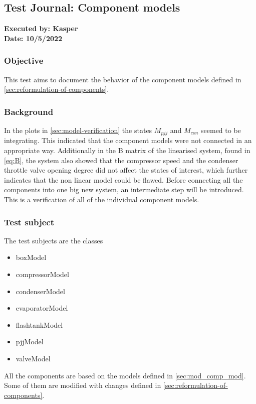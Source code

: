 \subsection{Test Journal: Component models} \label{app:tj_0}

\textbf{Executed by: Kasper} \\
\textbf{Date: 10/5/2022}

\subsubsection*{Objective}
This test aims to document the behavior of the component models defined in \cref{sec:reformulation-of-components}.

\subsubsection*{Background}
In the plots in \cref{sec:model-verification} the states $ M_{pjj} $ and $ M_{con} $ seemed to be integrating. This indicated that the component models were not connected in an appropriate way.
Additionally in the B matrix of the linearised system, found in \cref{eq:B}, the system also showed that the compressor speed and the condenser throttle valve opening degree did not affect the states of interest, which further indicates that the non linear model could be flawed.
Before connecting all the components into one big new system, an intermediate step will be introduced. This is a verification of all of the individual component models.


\subsubsection*{Test subject}
The test subjects are the classes
\begin{itemize}
	\item boxModel
	\item compressorModel
	\item condenserModel
	\item evaporatorModel
	\item flashtankModel
	\item pjjModel
	\item valveModel
\end{itemize}
All the components are based on the models defined in \cref{sec:mod_comp_mod}. Some of them are modified with changes defined in \cref{sec:reformulation-of-components}.\\

